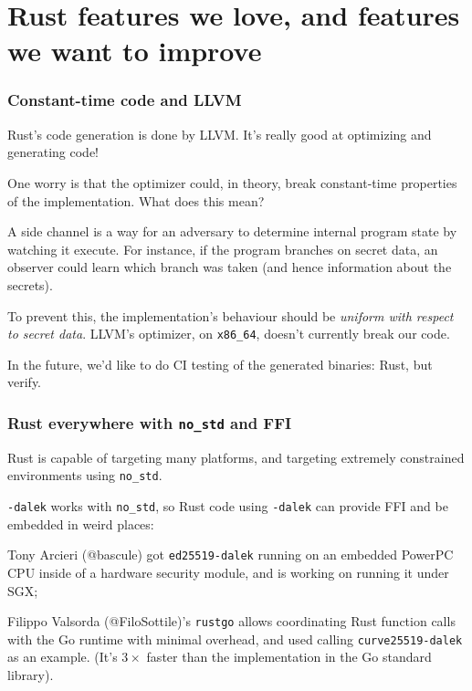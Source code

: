 \documentclass[xetex,aspectratio=169]{beamer}
\newcommand{\ZZ}{\mathbb{Z}}
\begin{document}


\section{Rust features we love, and features we want to improve}

  \begin{frame}
    \frametitle{Constant-time code and LLVM}
    
    Rust's code generation is done by LLVM. \pause It's really good at optimizing and generating code!

    \pause One worry is that the optimizer could, in theory, break \alert{constant-time} properties of the implementation.  What does this mean?

    \pause A side channel is a way for an adversary to determine internal program state by watching it execute.  \pause For instance, if the program branches on secret data, an observer could learn which branch was taken (and hence information about the secrets).

    \pause To prevent this, the implementation's behaviour should be \emph{uniform with respect to secret data}.
    \pause LLVM's optimizer, on \texttt{x86\_64}, doesn't currently break our code.  

    \pause In the future, we'd like to do CI testing of the generated binaries: Rust, but verify.
  \end{frame}

  \begin{frame}
    \frametitle{Rust everywhere with \texttt{no\_std} and FFI}
    
    Rust is capable of targeting many platforms, and targeting extremely constrained environments using \texttt{no\_std}.
    
    \pause \texttt{-dalek} works with \texttt{no\_std}, so Rust code using \texttt{-dalek} can provide FFI and be embedded in weird places:
    
    \pause Tony Arcieri (@bascule) got \texttt{ed25519-dalek} running on an
embedded PowerPC CPU inside of a hardware security module, and is working on running it under SGX;
    
    \pause Filippo Valsorda (@FiloSottile)'s \texttt{rustgo} allows coordinating Rust
function calls with the Go runtime with minimal overhead, and used
calling \texttt{curve25519-dalek} as an example. \pause (It's $3\times{} $ faster than the implementation in the Go standard library).

  \end{frame}
\end{document}

